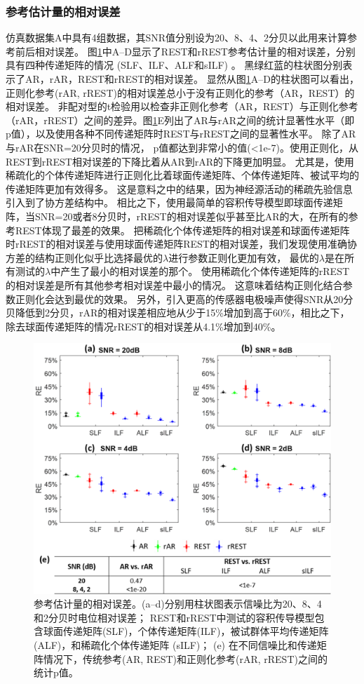 \subsubsection{参考估计量的相对误差}
仿真数据集A中具有4组数据，其SNR值分别设为20、8、4、2分贝以此用来计算参考前后相对误差。 图\ref{3.4}中A–D显示了REST和rREST参考估计量的相对误差，分别具有四种传递矩阵的情况 (SLF、ILF、ALF和sILF) 。 黑绿红蓝的柱状图分别表示了AR，rAR，REST和rREST的相对误差。 显然从图\ref{3.4}A–D的柱状图可以看出，正则化参考(rAR, rREST)的相对误差总小于没有正则化的参考（AR，REST）的相对误差。 非配对型的t检验用以检查非正则化参考（AR，REST）与正则化参考（rAR，rREST）之间的差异。图\ref{3.4}E列出了AR与rAR之间的统计显著性水平（即p值），以及使用各种不同传递矩阵时REST与rREST之间的显著性水平。 除了AR与rAR在SNR=20分贝时的情况， p值都达到非常小的值(<1e-7)。使用正则化，从REST到rREST相对误差的下降比着从AR到rAR的下降更加明显。 尤其是，使用稀疏化的个体传递矩阵进行正则化比着球面传递矩阵、个体传递矩阵、被试平均的传递矩阵更加有效得多。 这是意料之中的结果，因为神经源活动的稀疏先验信息引入到了协方差结构中。 相比之下，使用最简单的容积传导模型即球面传递矩阵，当SNR=20或者8分贝时，rREST的相对误差似乎甚至比AR的大，在所有的参考REST体现了最差的效果。 把稀疏化个体传递矩阵的相对误差和球面传递矩阵时rREST的相对误差与使用球面传递矩阵REST的相对误差，我们发现使用准确协方差的结构正则化似乎比选择最优的$\lambda$进行参数正则化更加有效， 最优的$\lambda$是在所有测试的$\lambda$中产生了最小的相对误差的那个。 使用稀疏化个体传递矩阵的rREST的相对误差是所有其他参考相对误差中最小的情况。 这意味着结构正则化结合参数正则化会达到最优的效果。 另外，引入更高的传感器电极噪声使得SNR从20分贝降低到2分贝，rAR的相对误差相应地从少于15\%增加到高于60\%，相比之下，除去球面传递矩阵的情况rREST的相对误差从4.1\%增加到40\%。
\begin{figure}[!ht]
	\centering
	\includegraphics[width=15cm]{pic/Frontier/figure4.png}
	\caption{参考估计量的相对误差。(a–d)分别用柱状图表示信噪比为20、8、4和2分贝时电位相对误差；	REST和rREST中测试的容积传导模型包含球面传递矩阵(SLF)，个体传递矩阵(ILF)，被试群体平均传递矩阵(ALF)，和稀疏化个体传递矩阵 (sILF)； (e) 在不同信噪比和传递矩阵情况下，传统参考(AR, REST)和正则化参考(rAR, rREST)之间的统计p值。}
	\label{3.4}
\end{figure}
